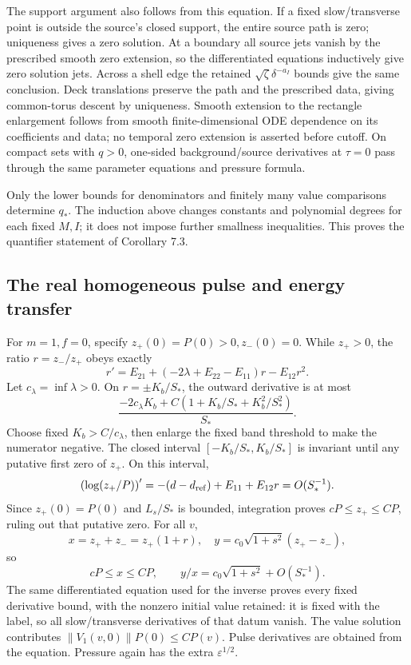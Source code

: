 \documentclass[10pt,a4paper]{article}
\begin{document}
The support argument also follows from this equation. If a fixed slow/transverse point is outside the source's closed support, the entire source path is zero; uniqueness gives a zero solution. At a boundary all source jets vanish by the prescribed smooth zero extension, so the differentiated equations inductively give zero solution jets. Across a shell edge the retained \(\sqrt\zeta\delta^{-a_I}\) bounds give the same conclusion. Deck translations preserve the path and the prescribed data, giving common-torus descent by uniqueness. Smooth extension to the rectangle enlargement follows from smooth finite-dimensional ODE dependence on its coefficients and data; no temporal zero extension is asserted before cutoff. On compact sets with \(q>0\), one-sided background/source derivatives at \(\tau=0\) pass through the same parameter equations and pressure formula.

Only the lower bounds for denominators and finitely many value comparisons determine \(q_*\). The induction above changes constants and polynomial degrees for each fixed \(M,I\); it does not impose further smallness inequalities. This proves the quantifier statement of Corollary 7.3.

\subsection{The real homogeneous pulse and energy transfer}\label{the-real-homogeneous-pulse-and-energy-transfer}

For \(m=1,f=0\), specify \(z_+(0)=P(0)>0,z_-(0)=0\). While \(z_+>0\), the ratio \(r=z_-/z_+\) obeys exactly \[
r'=E_{21}+(-2\lambda+E_{22}-E_{11})r-E_{12}r^2.
\] Let \(c_\lambda=\inf\lambda>0\). On \(r=\pm K_b/S_*\), the outward derivative is at most \[
\frac{-2c_\lambda K_b+C(1+K_b/S_*+K_b^2/S_*^2)}{S_*}.
\] Choose fixed \(K_b>C/c_\lambda\), then enlarge the fixed band threshold to make the numerator negative. The closed interval \([-K_b/S_*,K_b/S_*]\) is invariant until any putative first zero of \(z_+\). On this interval, \[
\left(\log(z_+/P)\right)'=-(d-d_{\rm ref})+E_{11}+E_{12}r=O(S_*^{-1}).
\] Since \(z_+(0)=P(0)\) and \(L_s/S_*\) is bounded, integration proves \(cP\le z_+\le CP\), ruling out that putative zero. For all \(v\), \[
x=z_++z_-=z_+(1+r),\quad
y=c_0\sqrt{1+s^2}(z_+-z_-),
\] so \[
cP\le x\le CP,\qquad
y/x=c_0\sqrt{1+s^2}+O(S_*^{-1}).
\] The same differentiated equation used for the inverse proves every fixed derivative bound, with the nonzero initial value retained: it is fixed with the label, so all slow/transverse derivatives of that datum vanish. The value solution contributes \(\|V_1(v,0)\|P(0)\le CP(v)\). Pulse derivatives are obtained from the equation. Pressure again has the extra \(\varepsilon^{1/2}\).
\end{document}
